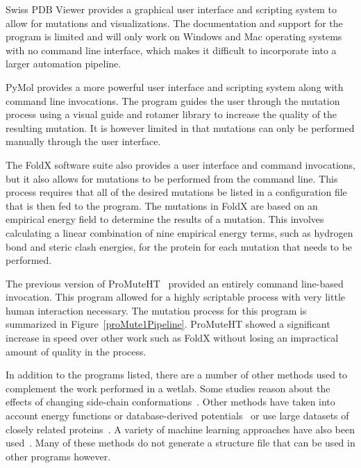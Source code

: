 \documentclass[sigconf]{acmart}
\begin{document}
Swiss PDB Viewer provides a graphical user interface and scripting system to allow for mutations and visualizations.  The documentation and support for the program is limited and will only work on Windows and Mac operating systems with no command line interface, which makes it difficult to incorporate into a larger automation pipeline.

PyMol provides a more powerful user interface and scripting system along with command line invocations.  The program guides the user through the mutation process using a visual guide and rotamer library to increase the quality of the resulting mutation.  It is however limited in that mutations can only be performed manually through the user interface.

The FoldX software suite also provides a user interface and command invocations, but it also allows for mutations to be performed from the command line.  This process requires that all of the desired mutations be listed in a configuration file that is then fed to the program.  The mutations in FoldX are based on an empirical energy field to determine the results of a mutation.  This involves calculating a linear combination of nine empirical energy terms, such as hydrogen bond and steric clash energies, for the protein for each mutation that needs to be performed.

The previous version of ProMuteHT~\cite{andersson2017} provided an entirely command line-based invocation. This program allowed for a highly scriptable process with very little human interaction necessary. The mutation process for this program is summarized in Figure~\ref{proMute1Pipeline}.  ProMuteHT showed a significant increase in speed over other work such as FoldX without losing an impractical amount of quality in the process.

In addition to the programs listed, there are a number of other methods used to complement the work performed in a wetlab.  Some studies reason about the effects of changing side-chain conformations~\cite{dunbrack1994,wodak1978, ponder1987}. Other methods have taken into account energy functions or database-derived potentials~\cite{gilis1997, lee1991} or use large datasets of closely related proteins~\cite{topham1997, worth2011, brender2015}.  A variety of machine learning approaches have also been used~\cite{cheng2006,akbal2013,jia2015,li2012,bromberg2008,hecht2015}.  Many of these methods do not generate a structure file that can be used in other programs however.

\end{document}
